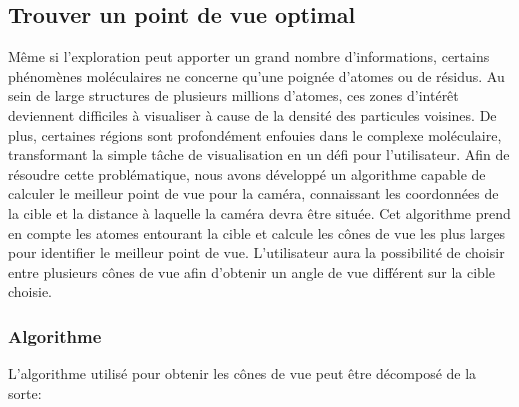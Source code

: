 \subsection{Trouver un point de vue optimal}

Même si l'exploration peut apporter un grand nombre d'informations, certains phénomènes moléculaires ne concerne qu'une poignée d'atomes ou de résidus. Au sein de large structures de plusieurs millions d'atomes, ces zones d'intérêt deviennent difficiles à visualiser à cause de la densité des particules voisines. De plus, certaines régions sont profondément enfouies dans le complexe moléculaire, transformant la simple tâche de visualisation en un défi pour l'utilisateur. Afin de résoudre cette problématique, nous avons développé un algorithme capable de calculer le meilleur point de vue pour la caméra, connaissant les coordonnées de la cible et la distance à laquelle la caméra devra être située. Cet algorithme prend en compte les atomes entourant la cible et calcule les cônes de vue les plus larges pour identifier le meilleur point de vue. L'utilisateur aura la possibilité de choisir entre plusieurs cônes de vue afin d'obtenir un angle de vue différent sur la cible choisie.

\subsubsection{Algorithme}

L'algorithme utilisé pour obtenir les cônes de vue peut être décomposé de la sorte:

